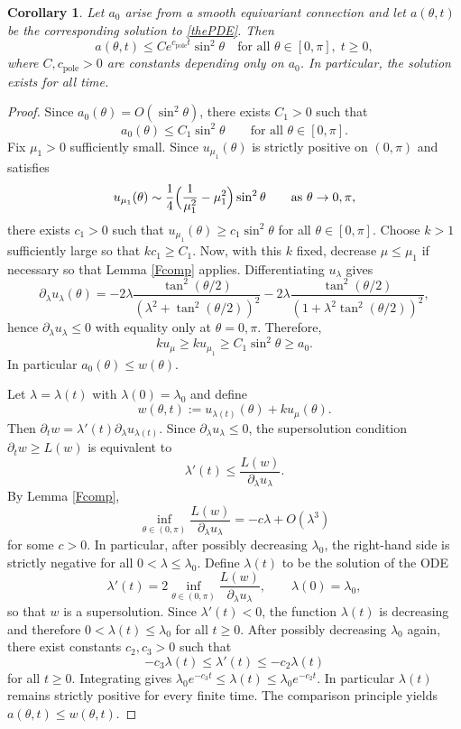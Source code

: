 \documentclass[11pt,a4paper]{article}
\numberwithin{equation}{section}
\theoremstyle{plain}
\newtheorem{corollary}[theorem]{Corollary}
\theoremstyle{remark}
\begin{document}
\begin{corollary}\label{longtimeexist}
Let $a_0$ arise from a smooth equivariant connection and let $a(\theta,t)$ be the corresponding solution to \eqref{thePDE}. Then 
$$
a(\theta,t) \le Ce^{c_{\mathrm{pole}}t} \sin^2\theta \quad \text{for all } \theta\in[0,\pi],\; t\geq0,
$$
where $C,c_{\mathrm{pole}}>0$ are constants depending only on $a_0$. In particular, the solution exists for all time.
\end{corollary}

\begin{proof}
Since $a_0(\theta)=O(\sin^2\theta)$, there exists $C_1>0$ such that
$$
a_0(\theta)\le C_1\sin^2\theta
\qquad\text{for all }\theta\in[0,\pi].
$$
Fix $\mu_1>0$ sufficiently small. Since $u_{\mu_1}(\theta)$ is strictly positive on $(0,\pi)$ and satisfies
$$
u_{\mu_1}(\theta)\sim
\frac{1}{4}\Bigl(\frac1{\mu_1^2}-\mu_1^2\Bigr)\sin^2\theta
\qquad\text{as }\theta\to0,\pi,
$$
there exists $c_1>0$ such that $u_{\mu_1}(\theta)\ge c_1\sin^2\theta$ for all $\theta\in[0,\pi]$. Choose $k>1$ sufficiently large so that $kc_1\ge C_1$.
Now, with this $k$ fixed, decrease $\mu\le\mu_1$ if necessary so that Lemma \ref{Fcomp} applies. Differentiating $u_\lambda$ gives
$$
\partial_\lambda u_\lambda(\theta)
=
-2\lambda\frac{\tan^2(\theta/2)}
       {(\lambda^2+\tan^2(\theta/2))^2}
-
2\lambda\frac{\tan^2(\theta/2)}
       {(1+\lambda^2\tan^2(\theta/2))^2},
$$
hence $\partial_\lambda u_\lambda\le0$ with equality only at $\theta=0,\pi$. Therefore,
$$
ku_\mu\ge ku_{\mu_1}\ge C_1\sin^2\theta\ge a_0.
$$
In particular $a_0(\theta)\le w(\theta)$.


Let $\lambda=\lambda(t)$ with $\lambda(0)=\lambda_0$ and define
$$
w(\theta,t):=u_{\lambda(t)}(\theta)+ku_\mu(\theta).
$$
Then $\partial_t w=\lambda'(t)\partial_\lambda u_{\lambda(t)}$.  Since $\partial_\lambda u_\lambda\le0$, the supersolution condition $\partial_t w\ge L(w)$ is equivalent to
$$
\lambda'(t)\le
\frac{L(w)}{\partial_\lambda u_\lambda}.
$$
By Lemma \ref{Fcomp},
$$
\inf_{\theta\in(0,\pi)}
\frac{L(w)}{\partial_\lambda u_\lambda}
=
-c\lambda+O(\lambda^3)
$$
for some $c>0$. In particular, after possibly decreasing $\lambda_0$, the
right-hand side is strictly negative for all $0<\lambda\le\lambda_0$.
Define $\lambda(t)$ to be the solution of the ODE
$$
\lambda'(t)
=
2\inf_{\theta\in(0,\pi)}
\frac{L(w)}{\partial_\lambda u_\lambda},
\qquad
\lambda(0)=\lambda_0,
$$
so that $w$ is a supersolution. Since $\lambda'(t)<0$, the function
$\lambda(t)$ is decreasing and therefore $0<\lambda(t)\le\lambda_0$ for all $t\geq0$. After possibly decreasing $\lambda_0$ again, there exist
constants $c_2,c_3>0$ such that
$$
-c_3\lambda(t)
\le
\lambda'(t)
\le
-c_2\lambda(t)
$$
for all $t\ge0$. Integrating gives $\lambda_0e^{-c_3t}
\le
\lambda(t)
\le
\lambda_0e^{-c_2t}$. In particular $\lambda(t)$ remains strictly positive for every finite time. The comparison principle yields $a(\theta,t)\le w(\theta,t)$.


\end{proof}
\end{document}
